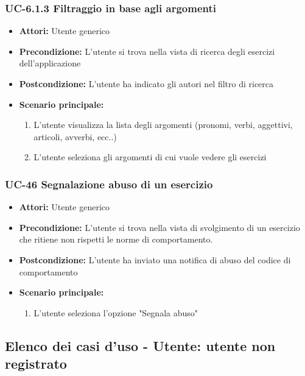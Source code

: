 \subsubsection{UC-6.1.3 Filtraggio in base agli argomenti}
	\begin{itemize}
		\item \textbf{Attori:} Utente generico
		\item \textbf{Precondizione: } L'utente si trova nella vista di ricerca degli esercizi dell'applicazione
		\item \textbf{Postcondizione: } L'utente ha indicato gli autori nel filtro di ricerca 
		\item \textbf{Scenario principale:}
		\begin{enumerate}
			\item L'utente visualizza la lista degli argomenti (pronomi, verbi, aggettivi, articoli, avverbi, ecc..)
			\item L'utente seleziona gli argomenti di cui vuole vedere gli esercizi
		\end{enumerate}
	\end{itemize}

\subsubsection{UC-46 Segnalazione abuso di un esercizio}
	\begin{itemize}
		\item \textbf{Attori:} Utente generico
		\item \textbf{Precondizione:} L'utente si trova nella vista di svolgimento di un esercizio che ritiene non rispetti le norme di comportamento.
		\item \textbf{Postcondizione:} L'utente ha inviato una notifica di abuso del codice di comportamento
		\item \textbf{Scenario principale:}
		\begin{enumerate}
			\item L'utente seleziona l'opzione "Segnala abuso"
		\end{enumerate}
	\end{itemize}

\subsection{Elenco dei casi d'uso - Utente: utente non registrato}

